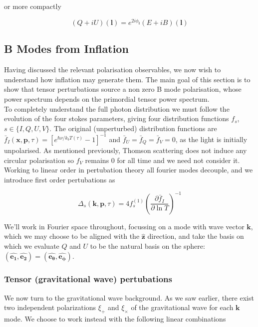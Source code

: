 \documentclass[a4paper,10pt]{article}
\renewcommand{\v}[1]{\mathbf{#1}}
\newcommand{\unit}[1]{\hat{\v{#1}}}
\begin{document}
or more compactly

\begin{equation}
(Q+iU)(\v{l}) = e^{2i\phi_\v{l}}(E+iB)(\v{l})
\end{equation}

\subsection{B Modes from Inflation}

Having discussed the relevant polarisation observables, we now wish to understand how inflation may generate them. The main goal of this section is to show that tensor perturbations source a non zero B mode polarisation, whose power spectrum depends on the primordial tensor power spectrum. \\

To completely understand the full photon distribution we must follow the evolution of the four stokes parameters, giving four distribution functions $f_s$, $s\in\{I,Q,U,V\}$. The original (unperturbed) distribution functions are $\bar{f}_I(\v{x},\v{p}, \tau)= [e^{\hbar \nu/k_b T(\tau)}-1]^{-1}$ and $\bar{f}_U=\bar{f}_Q=\bar{f}_V=0$, as the light is initially unpolarised. As mentioned previously, Thomson scattering does not induce any circular polarisation so $f_V$ remains 0 for all time and we need not consider it. Working to linear order in pertubation theory all fourier modes decouple, and we introduce first order pertubations as

\begin{equation}
\Delta_s(\v{k}, \v{p}, \tau) = 4f^{(1)}_s(\frac{\partial\bar{f}_I}{\partial \ln{T}})^{-1}
\end{equation}

We'll work in Fourier space throughout, focussing on a mode with wave vector $\v{k}$, which we may choose to be aligned with the $\unit{z}$ direction, and take the basis on which we evaluate $Q$ and $U$ to be the natural basis on the sphere: $(\unit{e_1}, \unit{e_2}) = (\unit{e_\theta}, \unit{e_\phi})$.\\

\subsubsection{Tensor (gravitational wave) pertubations}

We now turn to the gravitational wave background. As we saw earlier, there exist two independent polarizations $\xi_+$ and $\xi_\times$ of the gravitational wave for each $\v{k}$ mode. We choose to work instead with the following linear combinations
\end{document}
